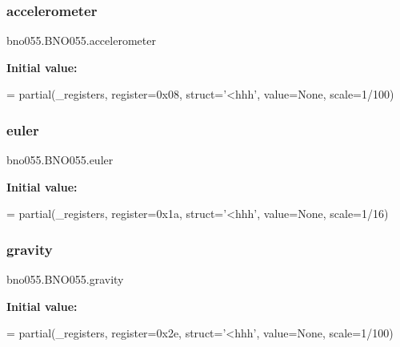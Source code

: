 \subsubsection{\texorpdfstring{accelerometer}{accelerometer}}
{\footnotesize\ttfamily bno055.\+B\+N\+O055.\+accelerometer\hspace{0.3cm}{\ttfamily [static]}}

{\bfseries Initial value\+:}
\begin{DoxyCode}
=  partial(\_registers, register=0x08, struct=\textcolor{stringliteral}{'<hhh'},
                            value=\textcolor{keywordtype}{None}, scale=1/100)
\end{DoxyCode}
\mbox{\label{classbno055_1_1BNO055_ac4ffc3d38971e557a8033288e3c0cc23}} 
\subsubsection{\texorpdfstring{euler}{euler}}
{\footnotesize\ttfamily bno055.\+B\+N\+O055.\+euler\hspace{0.3cm}{\ttfamily [static]}}

{\bfseries Initial value\+:}
\begin{DoxyCode}
=  partial(\_registers, register=0x1a, struct=\textcolor{stringliteral}{'<hhh'},
                    value=\textcolor{keywordtype}{None}, scale=1/16)
\end{DoxyCode}
\mbox{\label{classbno055_1_1BNO055_a09037156afd78239c24e3b36c0a74a0c}} 
\subsubsection{\texorpdfstring{gravity}{gravity}}
{\footnotesize\ttfamily bno055.\+B\+N\+O055.\+gravity\hspace{0.3cm}{\ttfamily [static]}}

{\bfseries Initial value\+:}
\begin{DoxyCode}
=  partial(\_registers, register=0x2e, struct=\textcolor{stringliteral}{'<hhh'},
                      value=\textcolor{keywordtype}{None}, scale=1/100)
\end{DoxyCode}
\mbox{\label{classbno055_1_1BNO055_aa2b0a5ebf6c1c9fae96e4ed9ffc7946f}} 
